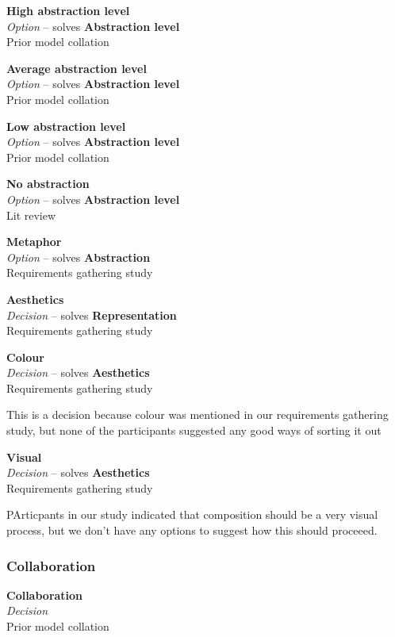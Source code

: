 \textbf{High abstraction level} \\ \emph{Option} -- solves \textbf{Abstraction level} \\ Prior model collation \cite{Grammel2010}

\textbf{Average abstraction level} \\ \emph{Option} -- solves \textbf{Abstraction level} \\ Prior model collation \cite{Grammel2010}

\textbf{Low abstraction level} \\ \emph{Option} -- solves \textbf{Abstraction level} \\ Prior model collation \cite{Grammel2010}

\textbf{No abstraction} \\ \emph{Option} -- solves \textbf{Abstraction level} \\ Lit review \cite{Nestler2010}

\textbf{Metaphor} \\ \emph{Option} -- solves \textbf{Abstraction} \\ Requirements gathering study
 
\textbf{Aesthetics} \\ \emph{Decision} -- solves \textbf{Representation} \\ Requirements gathering study

\textbf{Colour} \\ \emph{Decision} -- solves \textbf{Aesthetics} \\ Requirements gathering study

This is a decision because colour was mentioned in our requirements gathering study, but none of the participants suggested any good ways of sorting it out

\textbf{Visual} \\ \emph{Decision} -- solves \textbf{Aesthetics} \\ Requirements gathering study

PArticpants in our study indicated that composition should be a very visual process, but we don't have any options to suggest how this should proceeed.

\subsubsection{Collaboration}

\textbf{Collaboration} \\ \emph{Decision} \\ Prior model collation \cite{Aghaee2012}


